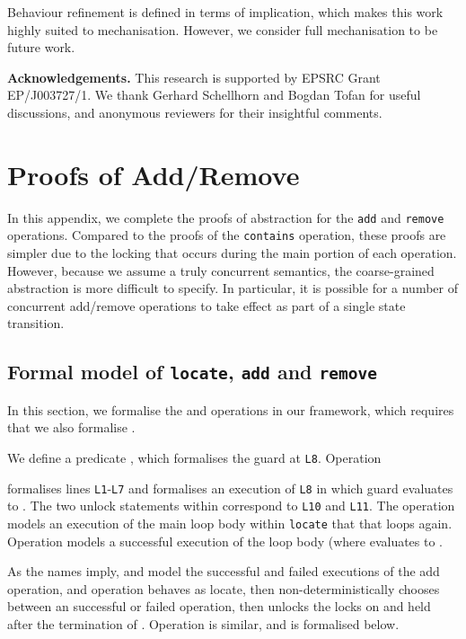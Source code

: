 \documentclass{article}
\theoremstyle{plain}
\theoremstyle{definition}
\begin{document}
Behaviour refinement is defined in terms of implication, which makes
this work highly suited to mechanisation. However, we consider full
mechanisation to be future work. 


\noindent\textbf{Acknowledgements.}
  This research is supported by EPSRC Grant EP/J003727/1. We thank
  Gerhard Schellhorn and Bogdan Tofan for useful discussions, and
  anonymous reviewers for their insightful comments.




\newpage
\appendix

\section{Proofs of Add/Remove}
\newcommand{\spec}[1]{\left\lfloor #1 \right\rfloor}
\newcommand{\NE}[1]{\underline{ #1}}

In this appendix, we complete the proofs of abstraction for the
\texttt{add} and \texttt{remove} operations. Compared to the proofs of
the \texttt{contains} operation, these proofs are simpler due to the
locking that occurs during the main portion of each
operation. However, because we assume a truly concurrent semantics,
the coarse-grained abstraction is more difficult to specify. In
particular, it is possible for a number of concurrent add/remove
operations to take effect as part of a single state transition. 




\subsection{Formal model of \texttt{locate}, \texttt{add} and
  \texttt{remove}} 

In this section, we formalise the  and 
operations in our framework, which requires that we also formalise
.

We define a predicate , which formalises the
guard at \texttt{L8}. Operation 
 
formalises lines \texttt{L1}-\texttt{L7} and  formalises an execution of \texttt{L8} in which guard
 evaluates to . The two unlock statements
within  correspond to \texttt{L10}
and \texttt{L11}. The  operation
models an execution of the main loop body within \texttt{locate} that
that loops again. Operation  models a
successful execution of the loop body (where 
evaluates to .

As the names imply,  and  model the
successful and failed executions of the add operation, and
 operation behaves as locate, then non-deterministically
chooses between an successful or failed operation, then unlocks the
locks on  and  held after the termination of
. Operation  is similar, and is formalised
below. 
\end{document}
